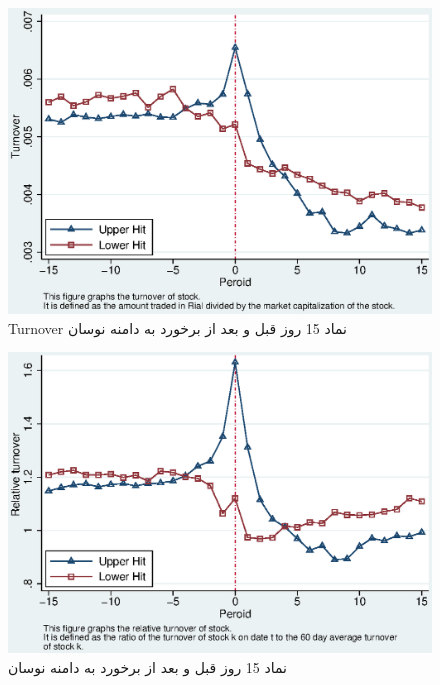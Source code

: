 \documentclass[12pt]{article}
\begin{document}
\begin{appendices}
\begin{figure}[htbp]
\centering
\includegraphics[width=0.8\columnwidth]{T.eps}
\caption{Turnover نماد 15 روز قبل و بعد از برخورد به دامنه نوسان}
\label{g8}
\end{figure}

\begin{figure}[htbp]
\centering
\includegraphics[width=0.8\columnwidth]{RT.eps}
\caption{ نماد 15 روز قبل و بعد از برخورد به دامنه نوسان}
\label{g9}
\end{figure}



\end{appendices}
\end{document}

